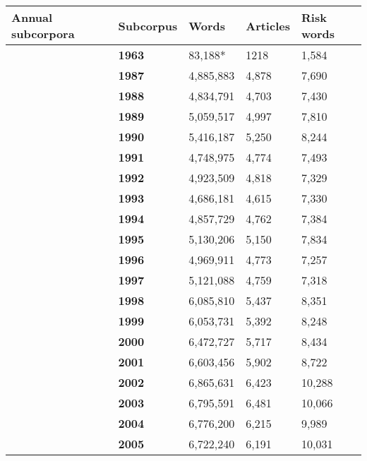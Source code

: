     \begin{table}
        \centering
        \footnotesize
    \begin{tabular}{p{1.5cm}|l|l|l|l|}

\hline

\multicolumn{1}{|p{1.5cm}|}{Annual subcorpora} & \textbf{Subcorpus} & \textbf{Words} & \textbf{Articles} & \textbf{Risk words}   \\ \hline
~ & \textbf{1963} & 83,188* & 1218 &  1,584  \\ \cline{2-5}
~ & \textbf{1987} & 4,885,883 & 4,878 &  7,690  \\ \cline{2-5}
~ & \textbf{1988} & 4,834,791 & 4,703 &  7,430  \\ \cline{2-5}
~ & \textbf{1989} & 5,059,517 & 4,997 &  7,810  \\ \cline{2-5}
~ & \textbf{1990} & 5,416,187 & 5,250 &  8,244  \\ \cline{2-5}
~ & \textbf{1991} & 4,748,975 & 4,774 &  7,493  \\ \cline{2-5}
~ & \textbf{1992} & 4,923,509 & 4,818 &  7,329  \\ \cline{2-5}
~ & \textbf{1993} & 4,686,181 & 4,615 &  7,330  \\ \cline{2-5}
~ & \textbf{1994} & 4,857,729 & 4,762 &  7,384  \\ \cline{2-5}
~ & \textbf{1995} & 5,130,206 & 5,150 &  7,834  \\ \cline{2-5}
~ & \textbf{1996} & 4,969,911 & 4,773 &  7,257  \\ \cline{2-5}
~ & \textbf{1997} & 5,121,088 & 4,759 &  7,318  \\ \cline{2-5}
~ & \textbf{1998} & 6,085,810 & 5,437 &  8,351  \\ \cline{2-5}
~ & \textbf{1999} & 6,053,731 & 5,392 &  8,248  \\ \cline{2-5}
~ & \textbf{2000} & 6,472,727 & 5,717 &  8,434  \\ \cline{2-5}
~ & \textbf{2001} & 6,603,456 & 5,902 &  8,722  \\ \cline{2-5}
~ & \textbf{2002} & 6,865,631 & 6,423 & 10,288  \\ \cline{2-5}
~ & \textbf{2003} & 6,795,591 & 6,481 & 10,066  \\ \cline{2-5}
~ & \textbf{2004} & 6,776,200 & 6,215 &  9,989  \\ \cline{2-5}
~ & \textbf{2005} & 6,722,240 & 6,191 & 10,031  \\ \cline{2-5}

\end{tabular}
\end{table}
